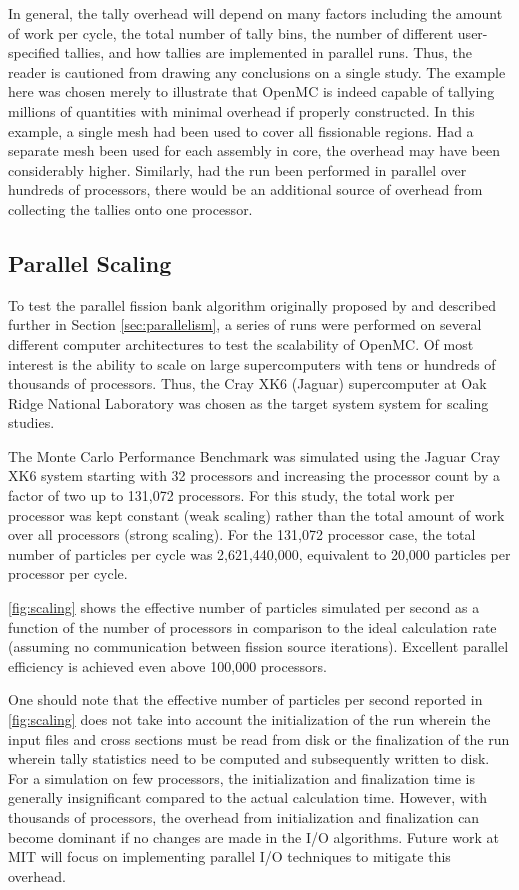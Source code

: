 \documentclass[authoryear,preprint]{elsarticle}
\begin{document}
In general, the tally overhead will depend on many factors including the amount
of work per cycle, the total number of tally bins, the number of different
user-specified tallies, and how tallies are implemented in parallel runs. Thus,
the reader is cautioned from drawing any conclusions on a single study. The
example here was chosen merely to illustrate that OpenMC is indeed capable of
tallying millions of quantities with minimal overhead if properly
constructed. In this example, a single mesh had been used to cover all
fissionable regions. Had a separate mesh been used for each assembly in core,
the overhead may have been considerably higher. Similarly, had the run been
performed in parallel over hundreds of processors, there would be an additional
source of overhead from collecting the tallies onto one processor.

\subsection{Parallel Scaling}

To test the parallel fission bank algorithm originally proposed by
\citet{fissionbank} and described further in Section \ref{sec:parallelism}, a
series of runs were performed on several different computer architectures to
test the scalability of OpenMC. Of most interest is the ability to scale on
large supercomputers with tens or hundreds of thousands of processors. Thus, the
Cray XK6 (Jaguar) supercomputer at Oak Ridge National Laboratory \citep{jaguar}
was chosen as the target system system for scaling studies.

The Monte Carlo Performance Benchmark was simulated using the Jaguar Cray XK6
system starting with 32 processors and increasing the processor count by a
factor of two up to 131,072 processors. For this study, the total work per
processor was kept constant (weak scaling) rather than the total amount of work
over all processors (strong scaling). For the 131,072 processor case, the total
number of particles per cycle was 2,621,440,000, equivalent to 20,000 particles
per processor per cycle.

\autoref{fig:scaling} shows the effective number of particles simulated per
second as a function of the number of processors in comparison to the ideal
calculation rate (assuming no communication between fission source
iterations). Excellent parallel efficiency is achieved even above 100,000
processors.

One should note that the effective number of particles per second reported in
\autoref{fig:scaling} does not take into account the initialization of the run
wherein the input files and cross sections must be read from disk or the
finalization of the run wherein tally statistics need to be computed and
subsequently written to disk. For a simulation on few processors, the
initialization and finalization time is generally insignificant compared to the
actual calculation time. However, with thousands of processors, the overhead
from initialization and finalization can become dominant if no changes are made
in the I/O algorithms. Future work at MIT will focus on implementing parallel
I/O techniques to mitigate this overhead.
\end{document}
